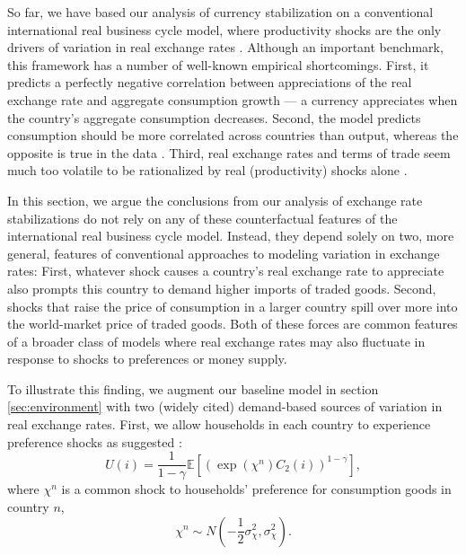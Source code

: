 \documentclass[12pt,letter]{article}
\theoremstyle{break} \theorembodyfont{\normalfont\itshape}
\theoremstyle{break}
\theoremstyle{break} \theorembodyfont{\normalfont\itshape}
\theoremstyle{break} \theorembodyfont{\normalfont\itshape}
\begin{document}
So far, we have based our analysis of currency stabilization on a
conventional international real business cycle model, where
productivity shocks are the only drivers of variation in real exchange
rates \citep{BackusSmith1993}. Although an important benchmark, this
framework has a number of well-known empirical shortcomings. First, it
predicts a perfectly negative correlation between appreciations of the
real exchange rate and aggregate consumption growth --- a currency
appreciates when the country's aggregate consumption decreases.
Second, the model predicts consumption should be more correlated
across countries than output, whereas the opposite is true in the data
\citep*{Backusetal1994}. Third, real exchange rates and terms of trade
seem much too volatile to be rationalized by real (productivity)
shocks alone \citep*{ChariKehoeMcGrattan2002}.

In this section, we argue the conclusions from our analysis of
exchange rate stabilizations do not rely on any of these
counterfactual features of the international real business cycle
model. Instead, they depend solely on two, more general, features of
conventional approaches to modeling variation in exchange rates:
First, whatever shock causes a country's real exchange rate to
appreciate also prompts this country to demand higher imports of
traded goods. Second, shocks that raise the price of consumption in a
larger country spill over more into the world-market price of traded
goods. Both of these forces are common features of a broader class of
models where real exchange rates may also fluctuate in response to
shocks to preferences or money supply.

To illustrate this finding, we augment our baseline model in section
\ref{sec:environment} with two (widely cited) demand-based sources of
variation in real exchange rates. First, we allow households in each
country to experience preference shocks as suggested
\cite{PavlovaRigobon2007}:
\begin{equation}
  U(i) = 
  \frac{1}{1- \gamma} \mathbb{E} \left[ \left( \exp(\chi^n) C_2(i) \right)^{1 - \gamma} \right],
  \label{eqn:utility_gen}
\end{equation}
where $\chi^n$ is a common shock to households' preference for
consumption goods in country \(n\),
\begin{equation*}
  \chi^n \sim N\left( -\frac{1}{2} \sigma_{\chi}^2, \sigma_{\chi}^2 \right). 
\end{equation*}
\end{document}
